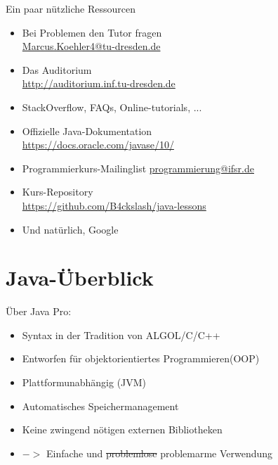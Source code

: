 \begin{frame}{Ein paar nützliche Ressourcen}
    \begin{itemize}[<+->]
		\item Bei Problemen den Tutor fragen \hfill \\
            \url{Marcus.Koehler4@tu-dresden.de}
		\item Das Auditorium \hfill \\
			\url{http://auditorium.inf.tu-dresden.de}
		\item StackOverflow, FAQs, Online-tutorials, ... \hfill \\
		\item Offizielle Java-Dokumentation \hfill \\
			\url{https://docs.oracle.com/javase/10/}
        \item Programmierkurs-Mailinglist \url{programmierung@ifsr.de}
		\item Kurs-Repository \\
			\url{https://github.com/B4ckslash/java-lessons}
        \item Und natürlich, Google
	\end{itemize}
\end{frame}

\section{Java-Überblick}
\begin{frame}{Über Java}
	Pro:
	\begin{itemize}
		\item Syntax in der Tradition von ALGOL/C/C++
        \item Entworfen für objektorientiertes Programmieren(OOP)
		\item Plattformunabhängig (JVM)
        \item Automatisches Speichermanagement
		\item Keine zwingend nötigen externen Bibliotheken
        \item[] $->$ Einfache und \sout{problemlose} problemarme Verwendung\footnotemark[1]
	\end{itemize}
\end{frame}

